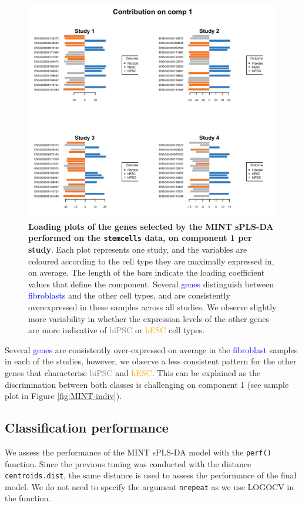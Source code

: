 \documentclass[]{book}
\begin{document}
\begin{figure}

{\centering \includegraphics[width=0.5\linewidth]{Figures/MINT/MINT-loading-1} 

}

\caption{\textbf{Loading plots of the genes selected by the MINT sPLS-DA performed on the \texttt{stemcells} data, on component 1 per study}. Each plot represents one study, and the variables are coloured according to the cell type they are maximally expressed in, on average. The length of the bars indicate the loading coefficient values that define the component. Several \textcolor{blue}{genes} distinguish between \textcolor{blue}{fibroblasts} and the other cell types, and are consistently overexpressed in these samples across all studies. We observe slightly more variability in whether the expression levels of the other genes are more indicative of \textcolor{grey}{hiPSC} or \textcolor{orange}{hESC} cell types.}\label{fig:MINT-loading}
\end{figure}



Several \textcolor{blue}{genes} are consistently over-expressed on average in the \textcolor{blue}{fibroblast} samples in each of the studies, however, we observe a less consistent pattern for the other genes that characterise \textcolor{grey}{hiPSC} and \textcolor{orange}{hESC}. This can be explained as the discrimination between both classes is challenging on component 1 (see sample plot in Figure \ref{fig:MINT-indiv}).

\hypertarget{mint:result:perf}{%
\subsection{Classification performance}\label{mint:result:perf}}

We assess the performance of the MINT sPLS-DA model with the \texttt{perf()} function. Since the previous tuning was conducted with the distance \texttt{centroids.dist}, the same distance is used to assess the performance of the final model. We do not need to specify the argument \texttt{nrepeat} as we use LOGOCV in the function.
\end{document}
